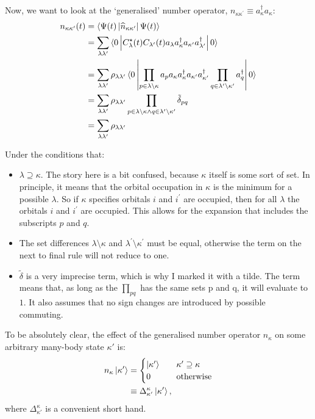 Now, we want to look at the `generalised' number operator, $n_{\kappa\kappa^\prime} \equiv a^\dagger_\kappa a_\kappa$:
\begin{align*}
n_{\kappa\kappa^\prime} (t) &= \braket{\Psi (t) \left| \widehat{n}_{\kappa\kappa^\prime}\right|\Psi (t)} \\
&=\sum_{\lambda\lambda^\prime} \braket{0\left| C_\lambda^\star (t) C_{\lambda^\prime} (t) a_\lambda a_\kappa^\dagger a_{\kappa^\prime} a_{\lambda^\prime}^\dagger \right|0}
\\
&= \sum_{\lambda\lambda^\prime} \rho_{\lambda\lambda^\prime} \braket{0\left| \prod_{p \in \lambda\setminus{\kappa}} a_p a_\kappa a_\kappa^\dagger a_{\kappa^\prime} a_{\kappa^\prime}^\dagger \prod_{q \in \lambda^\prime\setminus{\kappa^\prime}}a_q^\dagger \right|0}
\\
&= \sum_{\lambda\lambda^\prime} \rho_{\lambda\lambda^\prime} \prod_{p \in \lambda\setminus{\kappa} \wedge q \in \lambda^\prime\setminus{\kappa^\prime}} \tilde{\delta}_{pq}
\\
&=  \sum_{\lambda\lambda^\prime} \rho_{\lambda\lambda^\prime}
\end{align*}

Under the conditions that:
\begin{itemize}
\item $\lambda\supseteq\kappa$. The story here is a bit confused, because $\kappa$ itself is some sort of set. In principle, it means that the orbital occupation in $\kappa$ is the minimum for a possible $\lambda$. So if $\kappa$ specifies orbitals $i$ and $i^\prime$ are occupied, then for all $\lambda$ the orbitals $i$ and $i^\prime$ are occupied. This allows for the expansion that includes the subscripts $p$ and $q$.
\item The set differences $\lambda\setminus{\kappa}$ and $\lambda^\prime\setminus{\kappa^\prime}$ must be equal, otherwise the term on the next to final rule will not reduce to one. 
\item $\tilde{\delta}$ is a very imprecise term, which is why I marked it with a tilde. The term means that, as long as the $\prod_{pq}$ has the same sets p and q, it will evaluate to $1$. It also assumes that no sign changes are introduced by possible commuting.
\end{itemize}

To be absolutely clear, the effect of the generalised number operator $n_\kappa$ on some arbitrary many-body state $\kappa'$ is:
\begin{align}
n_\kappa \ket{\kappa'} &= \begin{cases} \ket{\kappa'}&\quad \kappa'\supseteq\kappa \\
0 & \quad \text{otherwise} \end{cases}
\label{eq:generalisednumberoperator}\\
&\equiv \Delta^{\kappa}_{\kappa'} \ket{\kappa'},\nonumber
\end{align}
where $\Delta^{\kappa}_{\kappa'}$ is a convenient short hand.

